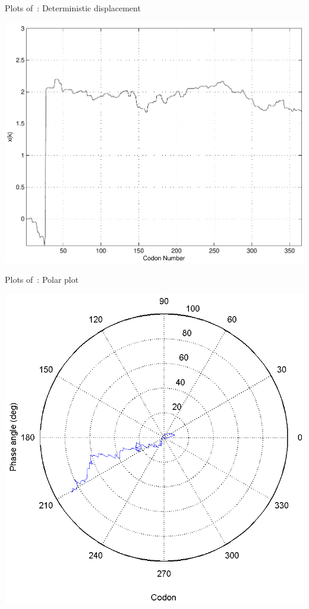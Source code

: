 \documentclass{article}
\begin{document}
\begin{cfigure}
  \parbox{0.4\linewidth}{
    \caption{Plots of~\prfB: Deterministic displacement}
    \label{prfB:deterministic:sub}
    \includegraphics[width=\linewidth]{prfB/deterministic}
  }
  \qquad
  \begin{minipage}{0.4\linewidth}
    \caption{Plots of~\prfB: Polar plot}
    \label{prfB:polar:sub}
    \includegraphics[width=\linewidth]{prfB/polar}
  \end{minipage}
\end{cfigure}
\end{document}
